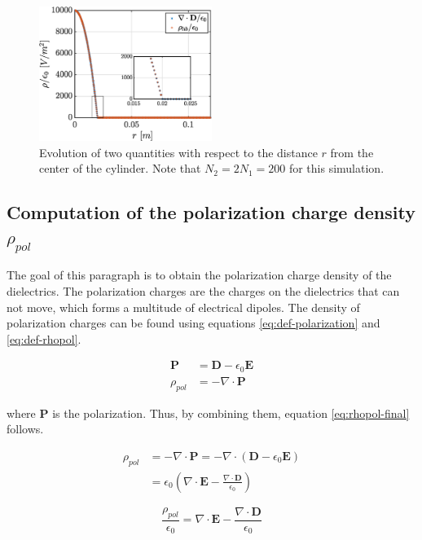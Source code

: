 \documentclass[a4paper,12pt,twoside]{article}
\newcommand{\mbf}[1]{\mathbf{#1}} %
\newcommand{\Div}[1]{\nabla\cdot\mathbf{#1}}
\newcommand{\bracket}[1]{\left(#1\right)}
\begin{document}
  \begin{figure}[h]
    \centering
    \includegraphics[width=0.5\textwidth]{graphs/exd2-diff.eps}
    \caption{Evolution of two quantities with respect to the distance $r$ from the center of the cylinder. Note that $N_2=2N_1=200$ for this simulation.} %
    \label{fig:d2}
  \end{figure}

  \subsection{Computation of the polarization charge density $\rho_{pol}$}
    The goal of this paragraph is to obtain the polarization charge density of the dielectrics.
    The polarization charges are the charges on the dielectrics that can not move, which forms a multitude of electrical dipoles. \cite{feynman:dielectrics}
    The density of polarization charges can be found using equations \eqref{eq:def-polarization} and \eqref{eq:def-rhopol}.

    \begin{align}
      \mbf{P} &= \mbf{D} - \epsilon_0\mbf{E}
      \label{eq:def-polarization} \\
      \rho_{pol} &= -\Div{\mbf{P}}
      \label{eq:def-rhopol}
    \end{align}

    where $\mbf{P}$ is the polarization.
    Thus, by combining them, equation \eqref{eq:rhopol-final} follows.

    \begin{align*}
      \rho_{pol} &= -\Div{\mbf{P}} = -\nabla\cdot\bracket{\mbf{D} - \epsilon_0\mbf{E}}\\
                 &= \epsilon_0\bracket{\Div{E} - \frac{\Div{D}}{\epsilon_0}}
    \end{align*}

    \begin{equation}
      \boxed{\frac{\rho_{pol}}{\epsilon_0} = \Div{E} - \frac{\Div{D}}{\epsilon_0}}
      \label{eq:rhopol-final}
    \end{equation}
\end{document}
